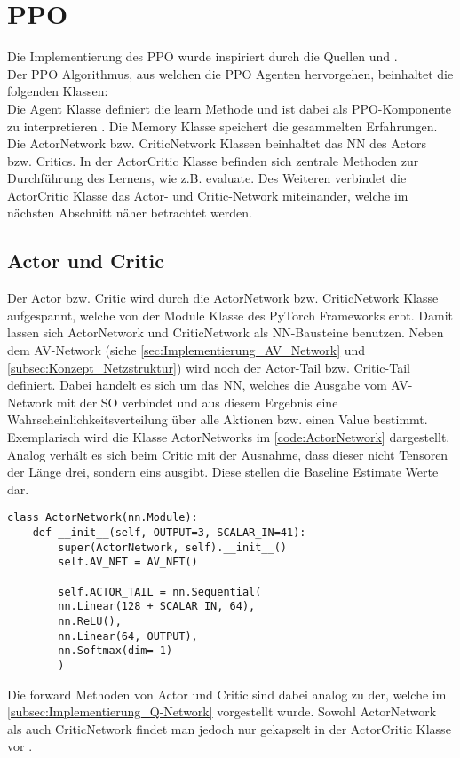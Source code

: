 \section{PPO} \label{sec:Implementierung_PPO}
Die Implementierung des PPO wurde inspiriert durch die Quellen \cite{pytorch_minimal_ppo} und \cite{Charles2013}.\\
Der PPO Algorithmus, aus welchen die PPO Agenten hervorgehen, beinhaltet die folgenden Klassen:\\
Die Agent Klasse definiert die learn Methode und ist dabei als PPO-Komponente zu interpretieren .
Die Memory Klasse speichert die gesammelten Erfahrungen.
Die ActorNetwork bzw. CriticNetwork Klassen beinhaltet das NN des Actors bzw. Critics.
In der ActorCritic Klasse befinden sich zentrale Methoden zur Durchführung des Lernens, wie z.B. evaluate. 
Des Weiteren verbindet die ActorCritic Klasse das Actor- und Critic-Network miteinander, welche im nächsten Abschnitt näher betrachtet werden.

\subsection{Actor und Critic} \label{subsec:Implementierung_Actor_und_Critic}
Der Actor bzw. Critic wird durch die ActorNetwork bzw. CriticNetwork Klasse aufgespannt, welche von der Module Klasse des PyTorch Frameworks erbt. Damit lassen sich ActorNetwork und CriticNetwork als NN-Bausteine benutzen.
Neben dem AV-Network (siehe \autoref{sec:Implementierung_AV_Network} und \autoref{subsec:Konzept_Netzstruktur}) wird noch der Actor-Tail bzw. Critic-Tail definiert. Dabei handelt es sich um das NN, welches die Ausgabe vom AV-Network mit der SO verbindet und aus diesem Ergebnis eine Wahrscheinlichkeitsverteilung über alle Aktionen bzw. einen Value bestimmt. 
Exemplarisch wird die Klasse ActorNetworks im \autoref{code:ActorNetwork} dargestellt. Analog verhält es sich beim Critic mit der Ausnahme, dass dieser nicht Tensoren der Länge drei, sondern eins ausgibt. Diese stellen die Baseline Estimate Werte  dar.
\begin{lstlisting}[caption=ActorNetwork, label=code:ActorNetwork, style=Python]
class ActorNetwork(nn.Module):
	def __init__(self, OUTPUT=3, SCALAR_IN=41):
		super(ActorNetwork, self).__init__()
		self.AV_NET = AV_NET()
		
		self.ACTOR_TAIL = nn.Sequential(
		nn.Linear(128 + SCALAR_IN, 64),
		nn.ReLU(),
		nn.Linear(64, OUTPUT),
		nn.Softmax(dim=-1)
		)
\end{lstlisting}
Die forward Methoden von Actor und Critic sind dabei analog zu der, welche im \autoref{subsec:Implementierung_Q-Network} vorgestellt wurde. 
Sowohl ActorNetwork als auch CriticNetwork findet man jedoch nur gekapselt in der ActorCritic Klasse vor .

